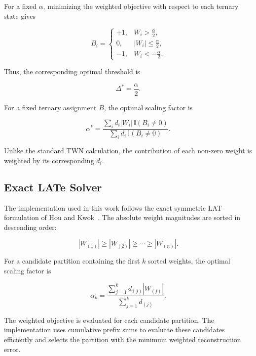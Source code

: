 \documentclass[conference]{IEEEtran}
\begin{document}
For a fixed $\alpha$, minimizing the weighted objective with respect to
each ternary state gives

\begin{equation}
B_i =
\begin{cases}
+1, & W_i > \frac{\alpha}{2},\\
0, & |W_i| \leq \frac{\alpha}{2},\\
-1, & W_i < -\frac{\alpha}{2}.
\end{cases}
\end{equation}

Thus, the corresponding optimal threshold is

\begin{equation}
\Delta^*=\frac{\alpha}{2}.
\end{equation}

For a fixed ternary assignment $B$, the optimal scaling factor is

\begin{equation}
\alpha^*
=
\frac{
\sum_i d_i |W_i|\,\mathbb{I}(B_i\neq0)
}{
\sum_i d_i\,\mathbb{I}(B_i\neq0)
}.
\end{equation}

Unlike the standard TWN calculation, the contribution of each
non-zero weight is weighted by its corresponding $d_i$.

\subsection{Exact LATe Solver}

The implementation used in this work follows the exact symmetric LAT
formulation of Hou and Kwok~\cite{hou2018lossaware}. The absolute
weight magnitudes are sorted in descending order:

\begin{equation}
|W_{(1)}|
\geq
|W_{(2)}|
\geq
\cdots
\geq
|W_{(n)}|.
\end{equation}

For a candidate partition containing the first $k$ sorted weights,
the optimal scaling factor is

\begin{equation}
\alpha_k
=
\frac{
\sum_{j=1}^{k}
d_{(j)}|W_{(j)}|
}{
\sum_{j=1}^{k}
d_{(j)}
}.
\end{equation}

The weighted objective is evaluated for each candidate partition. The
implementation uses cumulative prefix sums to evaluate these
candidates efficiently and selects the partition with the minimum
weighted reconstruction error.
\end{document}
